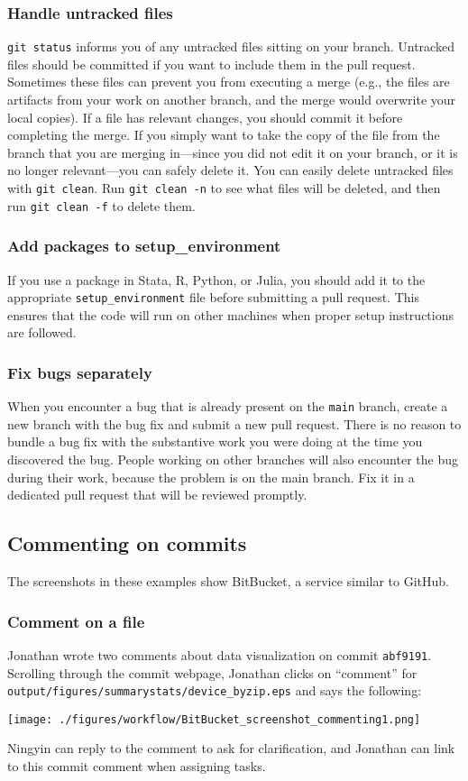 \subsubsection{Handle untracked files}
\texttt{git status} informs you of any untracked files sitting on your branch.
Untracked files should be committed if you want to include them in the pull request.
Sometimes these files can prevent you from executing a merge
(e.g., the files are artifacts from your work on another branch, and
the merge would overwrite your local copies).
If a file has relevant changes, you should commit it before completing the merge.
If you simply want to take the copy of the file from the branch that you are merging
in---since you did not edit it on your branch, or it is no longer relevant---you
can safely delete it.
You can easily delete untracked files with \texttt{git clean}.
Run \texttt{git clean -n} to see what files will be deleted,
and then run \texttt{git clean -f} to delete them.

\subsubsection{Add packages to setup\_environment}
If you use a package in Stata, R, Python, or Julia,
you should add it to the appropriate \texttt{setup\_environment} file before
submitting a pull request.
This ensures that the code will run on other machines when proper setup
instructions are followed.

\subsubsection{Fix bugs separately}
When you encounter a bug that is already present on the \texttt{main} branch,
create a new branch with the bug fix and submit a new pull request.
There is no reason to bundle a bug fix with the substantive work you were doing at the time you discovered the bug.
People working on other branches will also encounter the bug during their work,
because the problem is on the main branch.
Fix it in a dedicated pull request that will be reviewed promptly.

\subsection{Commenting on commits}

The screenshots in these examples show BitBucket, a service similar to GitHub.

\subsubsection{Comment on a file}
Jonathan wrote two comments about data visualization on commit \texttt{abf9191}.
Scrolling through the commit webpage, Jonathan clicks on ``comment'' for \texttt{output/figures/summarystats/device\_byzip.eps} and says the following:
\begin{center}\texttt{[image: ./figures/workflow/BitBucket\_screenshot\_commenting1.png]}\end{center}
Ningyin can reply to the comment to ask for clarification, and Jonathan can link to this commit comment when assigning tasks.

